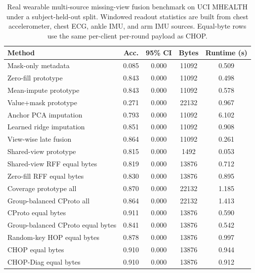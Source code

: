 \begin{table}[t]
\centering
\caption{Real wearable multi-source missing-view fusion benchmark on UCI MHEALTH under a subject-held-out split. Windowed readout statistics are built from chest accelerometer, chest ECG, ankle IMU, and arm IMU sources. Equal-byte rows use the same per-client per-round payload as CHOP.}
\label{tab:if-mhealth-fusion}
\scriptsize
\setlength{\tabcolsep}{3pt}
\renewcommand{\arraystretch}{0.94}
\begin{tabular}{lcccc}
\toprule
Method & Acc. & 95\% CI & Bytes & Runtime (s) \\
\midrule
Mask-only metadata & 0.085 & 0.000 & 11092 & 0.509 \\
Zero-fill prototype & 0.843 & 0.000 & 11092 & 0.498 \\
Mean-impute prototype & 0.843 & 0.000 & 11092 & 0.578 \\
Value+mask prototype & 0.271 & 0.000 & 22132 & 0.967 \\
Anchor PCA imputation & 0.793 & 0.000 & 11092 & 6.102 \\
Learned ridge imputation & 0.851 & 0.000 & 11092 & 0.908 \\
View-wise late fusion & 0.864 & 0.000 & 11092 & 0.261 \\
Shared-view prototype & 0.815 & 0.000 & 1492 & 0.053 \\
Shared-view RFF equal bytes & 0.819 & 0.000 & 13876 & 0.712 \\
Zero-fill RFF equal bytes & 0.830 & 0.000 & 13876 & 0.895 \\
Coverage prototype all & 0.870 & 0.000 & 22132 & 1.185 \\
Group-balanced CProto all & 0.864 & 0.000 & 22132 & 1.413 \\
CProto equal bytes & 0.911 & 0.000 & 13876 & 0.590 \\
Group-balanced CProto equal bytes & 0.841 & 0.000 & 13876 & 0.542 \\
Random-key HOP equal bytes & 0.878 & 0.000 & 13876 & 0.997 \\
CHOP equal bytes & 0.910 & 0.000 & 13876 & 0.944 \\
CHOP-Diag equal bytes & 0.910 & 0.000 & 13876 & 0.912 \\
\bottomrule
\end{tabular}
\end{table}
